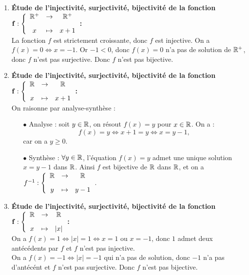 \documentclass[a4paper, 11pt,reqno]{article}
\begin{document}
\begin{correction}
\begin{enumerate}
\begin{itemize}
		      \end{itemize}
		\item  \textbf{\'Etude de l'injectivit\'e, surjectivit\'e, bijectivit\'e de la fonction $\mathbf{f:\left\lbrace\begin{array}{ccc} \R^+&\rightarrow& \R^+\vsec\\ x & \mapsto & x+1\end{array}\right.}$:}\\
		      La fonction $f$ est strictement croissante, donc $f$ est injective.
		      On a $f(x) = 0 \Leftrightarrow x=-1$. Or $-1<0$, donc $f(x) = 0$ n'a pas de solution de $\mathbb{R}^+$, donc $f$ n'est pas surjective. Donc $f$ n'est pas bijective.
		\item  \textbf{\'Etude de l'injectivit\'e, surjectivit\'e, bijectivit\'e de la fonction $\mathbf{f:\left\lbrace\begin{array}{ccc} \R&\rightarrow& \R\vsec\\ x & \mapsto & x+1\end{array}\right.}$:}\\
		      On raisonne par analyse-synth\`ese :
		      \begin{itemize}
			      \item[$\bullet$] Analyse : soit $y \in \mathbb{R}$, on r\'esout $f(x)=y$ pour $x \in \mathbb{R}$. On a :
				      $$f(x) = y \Leftrightarrow x+1= y \Leftrightarrow x=y-1,$$
				      car on a $y\geq 0$.
			      \item[$\bullet$] Synth\`ese : $\forall y \in \mathbb{R}$, l'\'equation $f(x)=y$ admet une unique solution $x=y-1$ dans $\mathbb{R}$. Ainsi $f$ est bijective de $\mathbb{R}$ dans $\mathbb{R}$, et on a $f^{-1} : \left\lbrace\begin{array}{ccc} \R&\rightarrow& \R\vsec\\ y & \mapsto & y-1 \end{array}\right.$.
		      \end{itemize}
		\item  \textbf{\'Etude de l'injectivit\'e, surjectivit\'e, bijectivit\'e de la fonction $\mathbf{f:\left\lbrace\begin{array}{ccc} \R&\rightarrow& \R\vsec\\ x & \mapsto & |x|\end{array}\right.}$:}\\
		      On a $f(x)=1 \Leftrightarrow |x|=1 \Leftrightarrow x=1$ ou $x=-1$, donc $1$ admet deux ant\'ec\'edents par $f$ et $f$ n'est pas injective.\\
		      On a $f(x) = -1 \Leftrightarrow |x|=-1$ qui n'a pas de solution, donc $-1$ n'a pas d'ant\'ec\'ent et $f$ n'est pas surjective. Donc $f$ n'est pas bijective.

\end{enumerate}
\end{correction}
\end{document}

